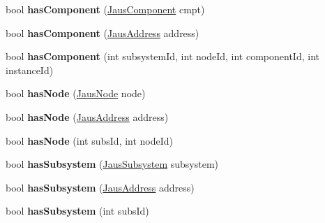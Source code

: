 \begin{DoxyCompactItemize}
\item 
\hypertarget{class_system_tree_a98588b448080e99d4780472b3c3b2f6b}{bool {\bfseries has\-Component} (\hyperlink{struct_jaus_component_struct}{\-Jaus\-Component} cmpt)}\label{class_system_tree_a98588b448080e99d4780472b3c3b2f6b}

\item 
\hypertarget{class_system_tree_a8f4890e38561adb9670dfefbd439d284}{bool {\bfseries has\-Component} (\hyperlink{struct_jaus_address_struct}{\-Jaus\-Address} address)}\label{class_system_tree_a8f4890e38561adb9670dfefbd439d284}

\item 
\hypertarget{class_system_tree_a03480d542f0971eee988f32eb70c9209}{bool {\bfseries has\-Component} (int subsystem\-Id, int node\-Id, int component\-Id, int instance\-Id)}\label{class_system_tree_a03480d542f0971eee988f32eb70c9209}

\item 
\hypertarget{class_system_tree_ac4dc345aa95a44750798f7785b9d3d88}{bool {\bfseries has\-Node} (\hyperlink{struct_jaus_node_struct}{\-Jaus\-Node} node)}\label{class_system_tree_ac4dc345aa95a44750798f7785b9d3d88}

\item 
\hypertarget{class_system_tree_a09a781033208a25463aea74756f26b00}{bool {\bfseries has\-Node} (\hyperlink{struct_jaus_address_struct}{\-Jaus\-Address} address)}\label{class_system_tree_a09a781033208a25463aea74756f26b00}

\item 
\hypertarget{class_system_tree_ae6bfdfa60d31fc835dac502ceae74c55}{bool {\bfseries has\-Node} (int subs\-Id, int node\-Id)}\label{class_system_tree_ae6bfdfa60d31fc835dac502ceae74c55}

\item 
\hypertarget{class_system_tree_ad9cc5193d99642723130a5475350d322}{bool {\bfseries has\-Subsystem} (\hyperlink{struct_jaus_subsystem_struct}{\-Jaus\-Subsystem} subsystem)}\label{class_system_tree_ad9cc5193d99642723130a5475350d322}

\item 
\hypertarget{class_system_tree_ab66ef688a60e4c7e49bb8f45cf6965d1}{bool {\bfseries has\-Subsystem} (\hyperlink{struct_jaus_address_struct}{\-Jaus\-Address} address)}\label{class_system_tree_ab66ef688a60e4c7e49bb8f45cf6965d1}

\item 
\hypertarget{class_system_tree_ac7f16b7b3620be9346a433266328771f}{bool {\bfseries has\-Subsystem} (int subs\-Id)}\label{class_system_tree_ac7f16b7b3620be9346a433266328771f}


\end{DoxyCompactItemize}
